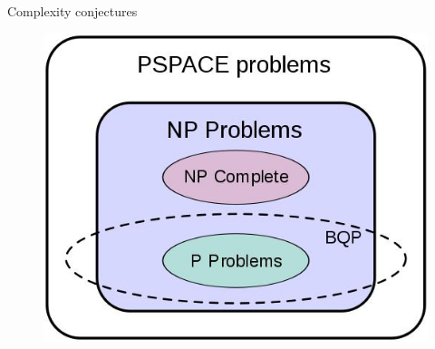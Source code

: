 \documentclass{beamer}
\begin{document}
\begin{frame}{Complexity conjectures}
\begin{figure}
  \includegraphics[scale=.5]{pasted16}
\end{figure}
\end{frame}
\end{document}
